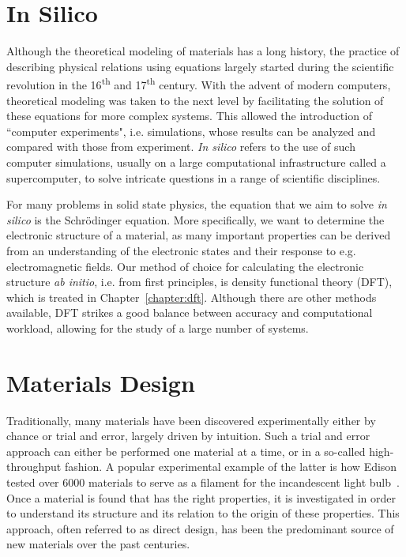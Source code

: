 \begin{refsection}
\newpage
\section{In Silico} \label{intro:sec-in_silico}

Although the theoretical modeling of materials has a long history, the practice 
of describing physical relations using equations largely started during the 
scientific revolution in the 16\textsuperscript{th} and 17\textsuperscript{th} 
century. With the advent of modern computers, theoretical modeling was taken 
to the next level by facilitating the solution of these equations for more 
complex systems. This allowed the introduction of ``computer experiments", i.e. 
simulations, whose results can be analyzed and compared with those from 
experiment. \textit{In silico} refers to the use of such computer simulations, 
usually on a large computational infrastructure called a supercomputer, to 
solve intricate questions in a range of scientific disciplines. 

For many problems in solid state physics, the equation that we aim to solve 
\textit{in silico} is the Schr\"odinger equation. More specifically, we want 
to determine the electronic structure of a material, as many important 
properties can be derived from an understanding of the electronic states and 
their response to e.g. electromagnetic fields. Our method of choice for 
calculating the electronic structure \textit{ab initio}, i.e. from 
first principles, is density functional theory (\gls{DFT}), which is treated in 
Chapter~\ref{chapter:dft}. Although there are other methods available, \gls{DFT} 
strikes a good balance between accuracy and computational workload, allowing 
for the study of a large number of systems.

\section{Materials Design} \label{intro:sec-materials_design}

Traditionally, many materials have been discovered experimentally either by 
chance or trial and error, largely driven by intuition. Such a trial and error 
approach can either be performed one material at a time, or in a so-called 
high-throughput fashion. A popular experimental example of the latter is how 
Edison tested over 6000 materials to serve as a filament for the incandescent 
light bulb~\cite{E.1918}. Once a material is found that has the right properties, 
it is investigated in order to understand its structure and its relation to the 
origin of these properties. This approach, often referred to as direct design, 
has been the predominant source of new materials over the past centuries.


\end{refsection}
